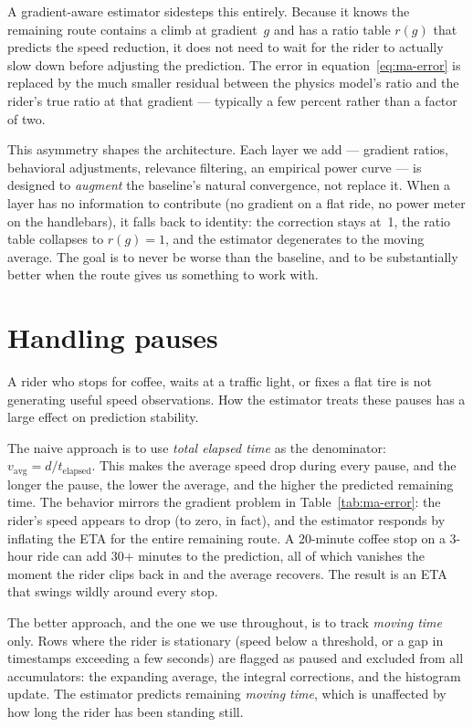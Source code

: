 \documentclass[11pt,a4paper]{article}
\begin{document}
A gradient-aware estimator sidesteps this entirely. Because it knows
the remaining route contains a climb at gradient~$g$ and has a ratio
table $r(g)$ that predicts the speed reduction, it does not need to
wait for the rider to actually slow down before adjusting the
prediction. The error in equation~\eqref{eq:ma-error} is replaced by
the much smaller residual between the physics model's ratio and the
rider's true ratio at that gradient --- typically a few percent rather
than a factor of two.

This asymmetry shapes the architecture. Each layer we add ---
gradient ratios, behavioral adjustments, relevance filtering, an
empirical power curve --- is designed to \emph{augment} the
baseline's natural convergence, not replace it. When a layer has no
information to contribute (no gradient on a flat ride, no power meter
on the handlebars), it falls back to identity: the correction stays
at~1, the ratio table collapses to $r(g) = 1$, and the estimator
degenerates to the moving average. The goal is to never be worse than
the baseline, and to be substantially better when the route gives us
something to work with.


\section{Handling pauses}
\label{sec:pauses}

A rider who stops for coffee, waits at a traffic light, or fixes a
flat tire is not generating useful speed observations. How the
estimator treats these pauses has a large effect on prediction
stability.

The naive approach is to use \emph{total elapsed time} as the
denominator: $v_{\text{avg}} = d / t_{\text{elapsed}}$. This makes
the average speed drop during every pause, and the longer the pause,
the lower the average, and the higher the predicted remaining time.
The behavior mirrors the gradient problem in
Table~\ref{tab:ma-error}: the rider's speed appears to drop (to
zero, in fact), and the estimator responds by inflating the ETA
for the entire remaining route. A 20-minute coffee stop on a
3-hour ride can add 30+ minutes to the prediction, all of which
vanishes the moment the rider clips back in and the average
recovers. The result is an ETA that swings wildly around every stop.

The better approach, and the one we use throughout, is to track
\emph{moving time} only. Rows where the rider is stationary (speed
below a threshold, or a gap in timestamps exceeding a few seconds)
are flagged as paused and excluded from all accumulators: the
expanding average, the integral corrections, and the histogram
update. The estimator predicts remaining \emph{moving time}, which
is unaffected by how long the rider has been standing still.
\end{document}
